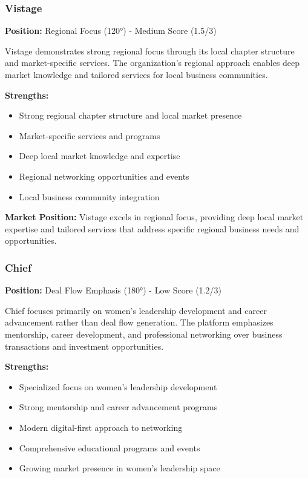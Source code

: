 \subsubsection{Vistage}
\textbf{Position:} Regional Focus (120°) - Medium Score (1.5/3)

Vistage demonstrates strong regional focus through its local chapter structure and market-specific services. The organization's regional approach enables deep market knowledge and tailored services for local business communities.

\textbf{Strengths:}
\begin{itemize}
    \item Strong regional chapter structure and local market presence
    \item Market-specific services and programs
    \item Deep local market knowledge and expertise
    \item Regional networking opportunities and events
    \item Local business community integration
\end{itemize}

\textbf{Market Position:} Vistage excels in regional focus, providing deep local market expertise and tailored services that address specific regional business needs and opportunities.

\subsubsection{Chief}
\textbf{Position:} Deal Flow Emphasis (180°) - Low Score (1.2/3)

Chief focuses primarily on women's leadership development and career advancement rather than deal flow generation. The platform emphasizes mentorship, career development, and professional networking over business transactions and investment opportunities.

\textbf{Strengths:}
\begin{itemize}
    \item Specialized focus on women's leadership development
    \item Strong mentorship and career advancement programs
    \item Modern digital-first approach to networking
    \item Comprehensive educational programs and events
    \item Growing market presence in women's leadership space
\end{itemize}

